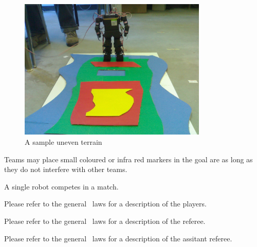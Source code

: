 \documentclass[12pt]{hurocup}
\begin{document}
\begin{lawlist}[LC]
  \begin{figure}
    \begin{center}
      \includegraphics[width=0.8\textwidth]{Figures/uneven-terrain}
    \end{center}
    \caption{A sample uneven terrain}
    \label{fig:uneven-terrain}
  \end{figure}

\item Teams may place small coloured or infra red markers in the goal
are as long as they do not interfere with other teams.

\end{lawlist}


\begin{lawlist}[LC]
\item A single robot competes in a match.
\end{lawlist}


Please refer to the general \HuroCup\ laws for a description of
the players.


Please refer to the general \HuroCup\ laws for a description of
the referee.


Please refer to the general \HuroCup\ laws for a description of
the assitant referee.

\end{document}
